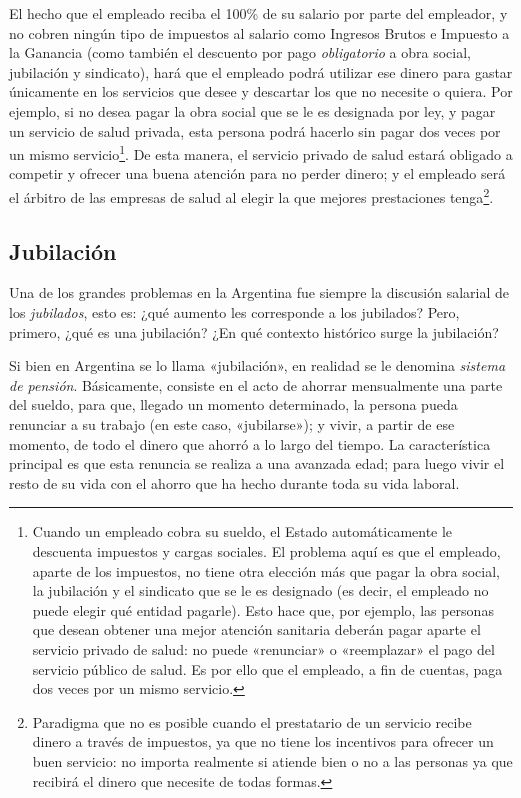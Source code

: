 \documentclass[12pt,a4paper,twoside]{book}
\begin{document}
El hecho que el empleado reciba el 100\% de su salario por parte del empleador, y no cobren ningún tipo de impuestos al salario como Ingresos Brutos e Impuesto a la Ganancia (como también el descuento por pago \textit{obligatorio} a obra social, jubilación y sindicato), hará que el empleado podrá utilizar ese dinero para gastar únicamente en los servicios que desee y descartar los que no necesite o quiera. Por ejemplo, si no desea pagar la obra social que se le es designada por ley, y pagar un servicio de salud privada, esta persona podrá hacerlo sin pagar dos veces por un mismo servicio\footnote{Cuando un empleado cobra su sueldo, el Estado automáticamente le descuenta impuestos y cargas sociales. El problema aquí es que el empleado, aparte de los impuestos, no tiene otra elección más que pagar la obra social, la jubilación y el sindicato que se le es designado (es decir, el empleado no puede elegir qué entidad pagarle). Esto hace que, por ejemplo, las personas que desean obtener una mejor atención sanitaria deberán pagar aparte el servicio privado de salud: no puede «renunciar» o «reemplazar» el pago del servicio público de salud. Es por ello que el empleado, a fin de cuentas, paga dos veces por un mismo servicio.}. De esta manera, el servicio privado de salud estará obligado a competir y ofrecer una buena atención para no perder dinero; y el empleado será el árbitro de las empresas de salud al elegir la que mejores prestaciones tenga\footnote{Paradigma que no es posible cuando el prestatario de un servicio recibe dinero a través de impuestos, ya que no tiene los incentivos para ofrecer un buen servicio: no importa realmente si atiende bien o no a las personas ya que recibirá el dinero que necesite de todas formas.}.

\subsection{Jubilación}
Una de los grandes problemas en la Argentina fue siempre la discusión salarial de los \textit{jubilados}, esto es: ¿qué aumento les corresponde a los jubilados? Pero, primero, ¿qué es una jubilación? ¿En qué contexto histórico surge la jubilación?

Si bien en Argentina se lo llama «jubilación», en realidad se le denomina \textit{sistema de pensión}. Básicamente, consiste en el acto de ahorrar mensualmente una parte del sueldo, para que, llegado un momento determinado, la persona pueda renunciar a su trabajo (en este caso, «jubilarse»); y vivir, a partir de ese momento, de todo el dinero que ahorró a lo largo del tiempo. La característica principal es que esta renuncia se realiza a una avanzada edad; para luego vivir el resto de su vida con el ahorro que ha hecho durante toda su vida laboral.
\end{document}
